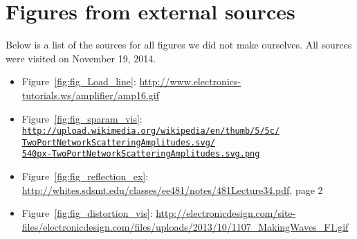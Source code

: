   \section{Figures from external sources}
  Below is a list of the sources for all figures we did not make ourselves. All sources were visited on November 19, 2014.
  \begin{itemize}
	  \item{Figure~\ref{fig:fig_Load_line}: \url{http://www.electronics-tutorials.ws/amplifier/amp16.gif}}
	  \item{Figure~\ref{fig:fig_sparam_vis}: \href{http://upload.wikimedia.org/wikipedia/en/thumb/5/5c/TwoPortNetworkScatteringAmplitudes.svg/540px-TwoPortNetworkScatteringAmplitudes.svg.png}{\texttt{http://upload.wikimedia.org/wikipedia/en/thumb/5/5c/ \\ TwoPortNetworkScatteringAmplitudes.svg/ \\ 540px-TwoPortNetworkScatteringAmplitudes.svg.png}}}
	  \item{Figure~\ref{fig:fig_reflection_ex}: \url{http://whites.sdsmt.edu/classes/ee481/notes/481Lecture34.pdf}, page 2}
	  \item{Figure~\ref{fig:fig_distortion_vis}: \url{http://electronicdesign.com/site-files/electronicdesign.com/files/uploads/2013/10/1107_MakingWaves_F1.gif}}
  \end{itemize}
